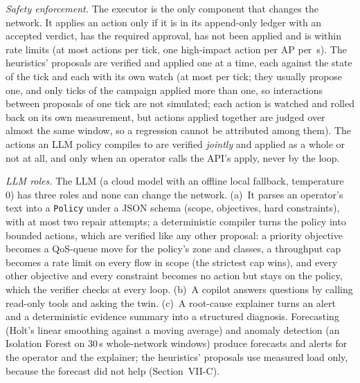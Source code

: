 \documentclass[conference]{IEEEtran}
\begin{document}
\emph{Safety enforcement.} The executor is the only component that changes the network. It applies an action only if it is in its append-only ledger with an accepted verdict, has the required approval, has not been applied and is within rate limits (at most \CfgMaxActions{} actions per tick, one high-impact action per AP per \CfgHighImpactGap\,s). The heuristics' proposals are verified and applied one at a time, each against the state of the tick and each with its own watch (at most \CfgMaxActions{} per tick; they usually propose one, and only \TickMulti{} ticks of the campaign applied more than one, so interactions between proposals of one tick are not simulated; each action is watched and rolled back on its own measurement, but actions applied together are judged over almost the same window, so a regression cannot be attributed among them). The actions an LLM policy compiles to are verified \emph{jointly} and applied as a whole or not at all, and only when an operator calls the API's apply, never by the loop.

\emph{LLM roles.} The LLM (a cloud model with an offline local fallback, temperature 0) has three roles and none can change the network. (a)~It parses an operator's text into a \texttt{Policy} under a JSON schema (scope, objectives, hard constraints), with at most two repair attempts; a deterministic compiler turns the policy into bounded actions, which are verified like any other proposal: a priority objective becomes a QoS-queue move for the policy's zone and classes, a throughput cap becomes a rate limit on every flow in scope (the strictest cap wins), and every other objective and every constraint becomes no action but stays on the policy, which the verifier checks at every loop. (b)~A copilot answers questions by calling read-only tools and asking the twin. (c)~A root-cause explainer turns an alert and a deterministic evidence summary into a structured diagnosis. Forecasting (Holt's linear smoothing \cite{holt2004} against a moving average) and anomaly detection (an Isolation Forest \cite{liu2008} on 30\,s whole-network windows) produce forecasts and alerts for the operator and the explainer; the heuristics' proposals use measured load only, because the forecast did not help (Section~VII-C).
\end{document}
